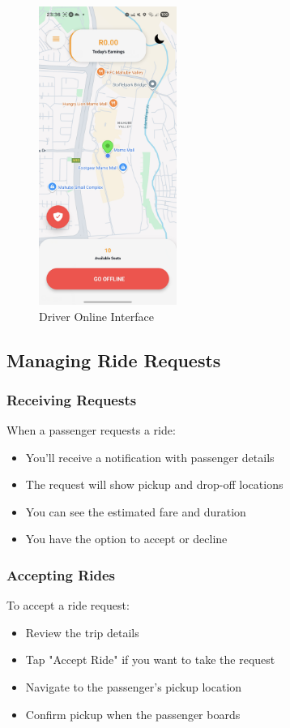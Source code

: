 \documentclass[12pt]{article}
\begin{document}
\begin{figure}[H]
  \centering
  \includegraphics[width=0.4\textwidth]{driver_online.png}
  \caption{Driver Online Interface}
\end{figure}

\subsection{Managing Ride Requests}
\subsubsection{Receiving Requests}
When a passenger requests a ride:
\begin{itemize}
    \item You'll receive a notification with passenger details
    \item The request will show pickup and drop-off locations
    \item You can see the estimated fare and duration
    \item You have the option to accept or decline
\end{itemize}

\subsubsection{Accepting Rides}
To accept a ride request:
\begin{itemize}
    \item Review the trip details
    \item Tap "Accept Ride" if you want to take the request
    \item Navigate to the passenger's pickup location
    \item Confirm pickup when the passenger boards
\end{itemize}
\end{document}
